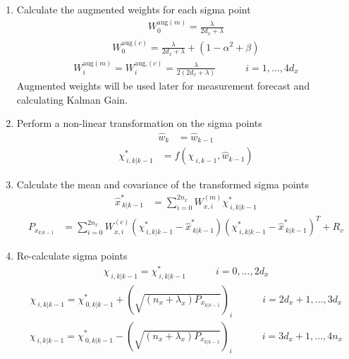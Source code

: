 \begin{enumerate}
    \item Calculate the augmented weights for each sigma point 
    \begin{align*}
        W^{\text{aug}(m)}_{0} = \frac{\lambda}{2d_{x}+ \lambda } 
        \end{align*}
         \begin{align*}
        W^{\text{aug}(c)}_{0} = \frac{\lambda}{2d_{x}+ \lambda} + (1 - \alpha^{2} + \beta) 
        \end{align*}
         \begin{align*}
        W^{\text{aug}(m)}_{i} = W^{\text{aug,}(c)}_{i} = \frac{\lambda}{2(2d_{x}+ \lambda) } \quad \quad \quad i=1,\dots,4d_{x} 
    \end{align*}
    Augmented weights will be used later for measurement forecast and calculating Kalman Gain.
    \item Perform a non-linear transformation on the sigma points
    \begin{align*}
        \hat{w}_{k} &= \hat{w}_{k-1} 
        \end{align*}
        \begin{align*}
        \chi^{*}_{\ i,k|k-1} &= f(\chi_{\ i,k-1},\hat{w}_{k-1})
    \end{align*}
    \item Calculate the mean and covariance of the transformed sigma points
    \begin{align*}
        \hat{x}^{*}_{\ k|k-1} &= \sum_{i=0}^{2n_{x}} W^{(m)}_{x,i} \chi^{*}_{\ i, k|k-1} 
        \end{align*}
        \begin{align*}
        P_{x_{k|k-1}} &=  \sum_{i=0}^{2n_{x}} W^{(c)}_{x,i} (\chi^{*}_{\ i, k|k-1} - \hat{x}^{*}_{\ k|k-1})(\chi^{*}_{\ i, k|k-1} - \hat{x}^{*}_{\ k|k-1})^{T} + R_{v} %
    \end{align*}
    \item Re-calculate sigma points
    \begin{align*}
        \chi_{\ i, k|k-1} = \chi^{*}_{\ i,k|k-1} \quad \quad \quad  i=0,...,2d_{x} 
         \end{align*}
         \begin{align*}
        \chi_{\ i, k|k-1} = \chi^{*}_{\ 0,k|k-1} + (\sqrt{(n_{x}+\lambda_{x})P_{x_{k|k-1}}})_{i}  \quad \quad \quad i=2d_{x}+1,\dots,3d_{x} 
         \end{align*}
         \begin{align*}
        \chi_{\ i, k|k-1} = \chi^{*}_{\ 0,k|k-1} - (\sqrt{(n_{x}+\lambda_{x})P_{x_{k|k-1}}})_{i}  \quad \quad \quad  i=3d_{x}+1,\dots,4n_{x}

\end{align*}
\end{enumerate}
